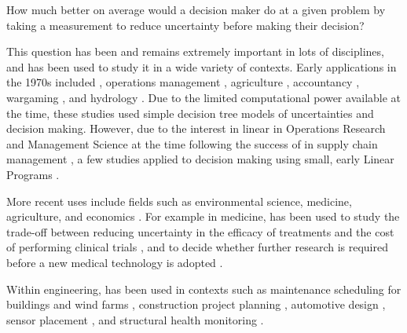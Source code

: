 \begin{cbox}[colback=Aquamarine!10!white]{}
How much better on average would a decision maker do at a given problem by taking a measurement to reduce uncertainty before making their decision?
\end{cbox}
\vfill

\noindent
This question has been and remains extremely important in lots of disciplines, and  has been used to study it in a wide variety of contexts. Early applications in the 1970s included \citep{conrad1980QuasiOptionValueExpected}, operations management \citep{bedford1966MeasuringValueInformation}, agriculture \citep{perrin1976ValueInformationValue}, accountancy \citep{mock1971ConceptsInformationValue}, wargaming \citep{oldham1996ValueInformation}, and hydrology \citep{klemes1977ValueInformationReservoir}. Due to the limited computational power available at the time, these studies used simple decision tree models of uncertainties and decision making. However, due to the interest in linear  in Operations Research and Management Science at the time \citep{williams1965StochasticLinearProgramming,dantzig1955LinearProgrammingUncertainty,wilson1966ProgrammingUncertainty} following the success of  in supply chain management \citep{dantzig1956RecentAdvancesLinear}, a few studies applied  to decision making using small, early Linear Programs \citep{avriel1970ValueInformationStochastic}.

More recent uses include fields such as environmental science, medicine, agriculture, and economics \citep{keisler2014ValueInformationAnalysis}. For example in medicine,  has been used to study the trade-off between reducing uncertainty in the efficacy of treatments and the cost of performing clinical trials \citep{willan2005ValueInformationOptimal}, and to decide whether further research is required before a new medical technology is adopted \citep{tuffaha2014ValueInformationAnalysis}.

Within engineering,  has been used in contexts such as maintenance scheduling for buildings \citep{grussing2018OptimizedBuildingComponent} and wind farms \citep{myklebust2020ValueInformationAnalysis}, construction project planning \citep{esnaasharyesfahani2020PrioritizingPreprojectPlanning}, automotive design \citep{acar2009SystemReliabilityBased}, sensor placement \citep{malings2016ValueInformationSpatially}, and structural health monitoring \citep{difrancesco2021DecisiontheoreticInspectionPlanning,difrancesco2023SystemEffectsIdentifying}.

